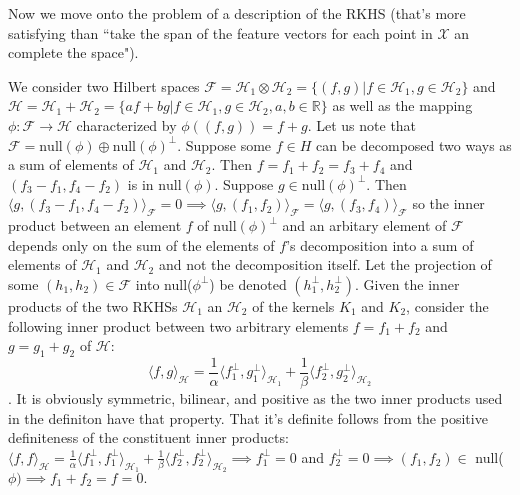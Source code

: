 \documentclass[12pt]{article}
\begin{document}
	Now we move onto the problem of a description of the RKHS (that's more satisfying than ``take the span of the feature vectors for each point in $\mathcal{X}$ an complete the space").




We consider two Hilbert spaces $\mathcal{F} = \mathcal{H}_1 \otimes \mathcal{H}_2 = \{(f,g) | f \in \mathcal{H}_1, g \in \mathcal{H}_2\}$ and $\mathcal{H} = \mathcal{H}_1 + \mathcal{H}_2 = \{af+bg | f  \in \mathcal{H}_1, g \in \mathcal{H}_2, a,b\in \mathbb{R}\}$ as well as the mapping $\phi: \mathcal{F} \rightarrow \mathcal{H}$ characterized by $\phi((f,g)) = f+g$. Let us note that $\mathcal{F} = \text{null}(\phi) \oplus \text{null}(\phi)^\bot$. Suppose some $f \in {H}$ can be decomposed two ways as a sum of elements of $\mathcal{H}_1$ and $\mathcal{H}_2$. Then $f = f_1 + f_2 = f_3 + f_4$ and $(f_3-f_1, f_4-f_2)$ is in $\text{null}(\phi)$. Suppose $g \in \text{null}(\phi)^\bot$. Then $\langle g, (f_3-f_1, f_4-f_2)\rangle_\mathcal{F} = 0 \implies \langle g, (f_1, f_2)\rangle_\mathcal{F} = \langle g, (f_3, f_4) \rangle_\mathcal{F}$ so the inner product between an element $f$ of $\text{null}(\phi)^\bot$ and an arbitary element of $\mathcal{F}$ depends only on the sum of the elements of $f$'s decomposition into a sum of elements of $\mathcal{H}_1$ and $\mathcal{H}_2$ and not the decomposition itself. Let the projection of some $(h_1, h_2) \in \mathcal{F}$ into null($\phi^\bot$) be denoted $(h_1^\bot, h_2^\bot)$. Given the inner products of the two RKHSs $\mathcal{H}_1$ an $\mathcal{H}_2$ of the kernels $K_1$ and $K_2$, consider the following inner product between two arbitrary elements $f = f_1+f_2$ and $g=g_1+g_2$ of $\mathcal{H}$:
$$ \langle f, g \rangle_\mathcal{H} = \frac{1}{\alpha} \langle f_1^\bot, g_1^\bot \rangle_{\mathcal{H}_1} + \frac{1}{\beta} \langle f_2^\bot, g_2^\bot \rangle_{\mathcal{H}_2}$$. 
It is obviously symmetric, bilinear, and positive as the two inner products used in the definiton have that property. That it's definite follows from the positive definiteness of the constituent inner products: $\langle f, f \rangle_\mathcal{H} = \frac{1}{\alpha} \langle f_1^\bot, f_1^\bot \rangle_{\mathcal{H}_1} + \frac{1}{\beta} \langle f_2^\bot, f_2^\bot \rangle_{\mathcal{H}_2} \implies f_1^\bot = 0 $ and $f_2^\bot = 0 \implies (f_1, f_2) \in $ null($\phi) \implies f_1 + f_2 = f = 0.$
\end{document}
